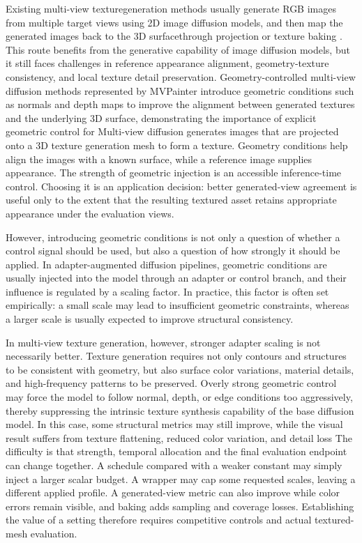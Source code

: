 \documentclass[times,twocolumn,final]{elsarticle}
\providecommand{\DIFadd}[1]{{\protect\color{blue} \sf #1}} %
\providecommand{\DIFdel}[1]{{\protect\color{red} \scriptsize #1}} %
\providecommand{\DIFaddbegin}{} %
\providecommand{\DIFaddend}{} %
\providecommand{\DIFdelbegin}{} %
\providecommand{\DIFdelend}{} %
\begin{document}
\DIFdel{Existing multi-view texturegeneration methods usually generate RGB images from multiple target views using 2D image diffusion models, and then map the generated images back to the 3D surfacethrough projection or texture baking \cite{chen2023text2tex,richardson2023texture,poole2023dreamfusion,chen2023fantasia3d}. This route benefits from the generative capability of image diffusion models, but it still faces challenges in reference appearance alignment, geometry-texture consistency, and local texture detail preservation. Geometry-controlled multi-view diffusion methods represented by MVPainter introduce geometric conditions such as normals and depth maps to improve the alignment between generated textures and the underlying 3D surface, demonstrating the importance of explicit geometric control for }\DIFdelend \DIFaddbegin \DIFadd{Multi-view diffusion generates images that are projected onto a }\DIFaddend 3D \DIFdelbegin \DIFdel{texture generation \cite{shao2025mvpainter}}\DIFdelend \DIFaddbegin \DIFadd{mesh to form a texture. Geometry conditions help align the images with a known surface, while a reference image supplies appearance. The strength of geometric injection is an accessible inference-time control. Choosing it is an application decision: better generated-view agreement is useful only to the extent that the resulting textured asset retains appropriate appearance under the evaluation views}\DIFaddend .

\DIFdelbegin \DIFdel{However, introducing geometric conditions is not only a question of whether a control signal should be used, but also a question of how strongly it should be applied. In adapter-augmented diffusion pipelines, geometric conditions are usually injected into the model through an adapter or control branch, and their influence is regulated by a scaling factor. In practice, this factor is often set empirically: a small scale may lead to insufficient geometric constraints, whereas a larger scale is usually expected to improve structural consistency. }%

\DIFdel{In multi-view texture generation, however, stronger adapter scaling is not necessarily better. Texture generation requires not only contours and structures to be consistent with geometry, but also surface color variations, material details, and high-frequency patterns to be preserved. Overly strong geometric control may force the model to follow normal, depth, or edge conditions too aggressively, thereby suppressing the intrinsic texture synthesis capability of the base diffusion model. In this case, some structural metrics may still improve, while the visual result suffers from texture flattening, reduced color variation, and detail loss}\DIFdelend \DIFaddbegin \DIFadd{The difficulty is that strength, temporal allocation and the final evaluation endpoint can change together. A schedule compared with a weaker constant may simply inject a larger scalar budget. A wrapper may cap some requested scales, leaving a different applied profile. A generated-view metric can also improve while color errors remain visible, and baking adds sampling and coverage losses. Establishing the value of a setting therefore requires competitive controls and actual textured-mesh evaluation}\DIFaddend .
\end{document}

